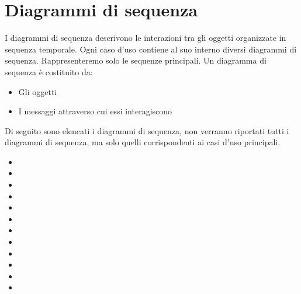 \section{Diagrammi di sequenza}
I diagrammi di sequenza descrivono le interazioni tra gli oggetti organizzate in sequenza temporale. Ogni caso d’uso contiene al suo interno diversi diagrammi di sequenza. Rappresenteremo solo le sequenze principali.
Un diagramma di sequenza è costituito da:
\begin{itemize}
	\item Gli oggetti
	\item I messaggi attraverso cui essi interagiscono
\end{itemize}
Di seguito sono elencati i diagrammi di sequenza, non verranno riportati tutti i diagrammi di sequenza, ma solo quelli corrispondenti ai casi d'uso principali.
\begin{itemize}
	\item {}
	\item {}
	\item {}
	\item {}
	\item {}
	\item {}
	\item {}
	\item {}
	\item {}
	\item {}
	\item {}
	\item {}
\end{itemize}

